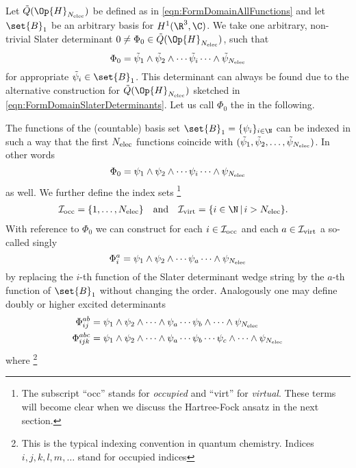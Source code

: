 \begin{rem}
	\label{rem:Determinants}
	Let $\tilde{Q}(\Op{H}_{\Nelec})$ be defined as in \eqref{eqn:FormDomainAllFunctions}
	and let $\set{B}_1$ be an arbitrary basis for $H^1(\R^3, \C)$.
	We take one arbitrary, non-trivial Slater determinant
	$0 \neq \Phi_0 \in \tilde{Q}(\Op{H}_{\Nelec})$,
	such that
	\[
		\Phi_0 = \tilde{\psi}_1 \wedge \tilde{\psi}_2 \wedge \cdots \tilde{\psi}_i \cdots \wedge \tilde{\psi}_{N_\text{elec}}
	\]
	for appropriate $\tilde{\psi}_i \in \set{B}_1$.
	This determinant can always be found due to the alternative
	construction for $\tilde{Q}(\Op{H}_{\Nelec})$ sketched
	in \eqref{eqn:FormDomainSlaterDeterminants}.
	Let us call $\Phi_0$ the 
	in the following.

	The functions of the (countable) basis set $\set{B}_1 = \{\psi_i\}_{i \in \N}$
	can be indexed in such a way
	that the first $N_\text{elec}$ functions coincide with $(\tilde{\psi}_1, \tilde{\psi}_2, \ldots, \tilde{\psi}_{N_\text{elec}})$.
	In other words
	\[
		\Phi_0 = \psi_1 \wedge \psi_2 \wedge \cdots \psi_i \cdots \wedge \psi_{N_\text{elec}}
	\]
	as well.
	We further define the index sets%
	\footnote{%
		The subscript ``occ'' stands for \textit{occupied}
		and ``virt'' for \textit{virtual}.
		These terms will become clear when we discuss the Hartree-Fock ansatz
		in the next section.
	}
	\begin{align*}
		\Iocc &= \{1, \ldots, \Nelec\}
		&&\text{and} &
		\Ivirt &= \{ i \in \N \, | \, i > \Nelec \}.
	\end{align*}
	With reference to $\Phi_0$ we can construct
	for each $i \in \mathcal{I}_\text{occ}$ and each $a \in \mathcal{I}_\text{virt}$
	a so-called singly 
	\[
		\Phi_i^a = \psi_1 \wedge \psi_2 \wedge \cdots \psi_a \cdots \wedge \psi_{N_\text{elec}}
	\]
	by replacing the $i$-th function of the Slater determinant
	wedge string
	by the $a$-th function of $\set{B}_1$
	without changing the order.
	Analogously one may define doubly or higher excited determinants
	\begin{align*}
		\Phi_{ij}^{ab} &= \psi_1 \wedge \psi_2 \wedge \cdots \wedge \psi_a \cdots \psi_b
			\wedge \cdots \wedge \psi_{N_\text{elec}} \\
		\Phi_{ijk}^{abc} &= \psi_1 \wedge \psi_2 \wedge \cdots \wedge \psi_a \cdots \psi_b
			\cdots \psi_c \wedge \cdots \wedge \psi_{N_\text{elec}}
	\end{align*}
	where%
	\footnote{%
		This is the typical indexing convention in quantum chemistry.
		Indices $i,j,k,l,m, \ldots$ stand for occupied indices
}
\end{rem}

